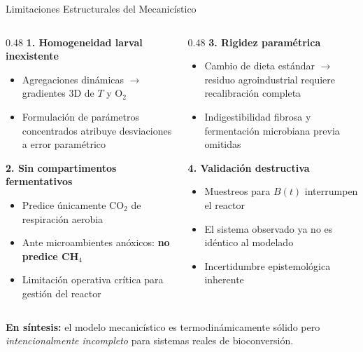 \documentclass[aspectratio=169, 11pt]{beamer}
\begin{document}
\begin{frame}{Limitaciones Estructurales del Mecanicístico}
\begin{columns}[T]
\begin{column}{0.48\textwidth}
\textbf{1. Homogeneidad larval inexistente}
\begin{itemize}
    \item Agregaciones dinámicas $\to$ gradientes 3D de $T$ y O$_2$
    \item Formulación de parámetros concentrados atribuye desviaciones a error paramétrico
\end{itemize}

\vspace{0.2cm}
\textbf{2. Sin compartimentos fermentativos}
\begin{itemize}
    \item Predice únicamente CO$_2$ de respiración aerobia
    \item Ante microambientes anóxicos: \textbf{no predice CH$_4$}
    \item Limitación operativa crítica para gestión del reactor
\end{itemize}
\end{column}
\begin{column}{0.48\textwidth}
\textbf{3. Rigidez paramétrica}
\begin{itemize}
    \item Cambio de dieta estándar $\to$ residuo agroindustrial requiere recalibración completa
    \item Indigestibilidad fibrosa y fermentación microbiana previa omitidas
\end{itemize}

\vspace{0.2cm}
\textbf{4. Validación destructiva}
\begin{itemize}
    \item Muestreos para $B(t)$ interrumpen el reactor
    \item El sistema observado ya no es idéntico al modelado
    \item Incertidumbre epistemológica inherente
\end{itemize}
\end{column}
\end{columns}
\vfill
\begin{center}
\textcolor{naranjaAlerta}{\textbf{En síntesis:}} el modelo mecanicístico es termodinámicamente sólido pero \textit{intencionalmente incompleto} para sistemas reales de bioconversión.
\end{center}
\end{frame}
\end{document}
